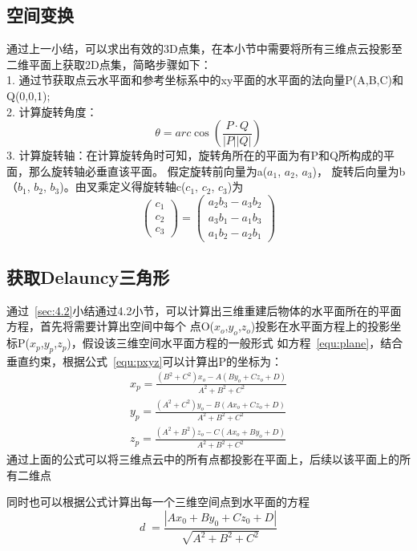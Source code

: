 \subsection{空间变换}
\label{sec:4.4.2}
通过上一小结，可以求出有效的3D点集，在本小节中需要将所有三维点云投影至二维平面上获取2D点集，简略步骤如下：\\
1.	通过节获取点云水平面和参考坐标系中的xy平面的水平面的法向量P(A,B,C)和Q(0,0,1);\\
2.	计算旋转角度：
\begin{equation}
\theta=arc\cos(\frac{P\cdot Q}{\left|P\right|\left|Q\right|})
\end{equation}
3.	计算旋转轴：在计算旋转角时可知，旋转角所在的平面为有P和Q所构成的平面，那么旋转轴必垂直该平面。
假定旋转前向量为a($a_1$, $a_2$, $a_3$)， 旋转后向量为b（$b_1$, $b_2$, $b_3$)。由叉乘定义得旋转轴c($c_1$, $c_2$, $c_3$)为
\begin{equation}
\begin{pmatrix}c_1\\c_2\\c_3\end{pmatrix}=\begin{pmatrix}a_2b_3-a_3b_2\\a_3b_1-a_1b_3\\a_1b_2-a_2b_1\end{pmatrix}
\end{equation}


\subsection{获取Delauncy三角形}
\label{sec:4.4.3}
通过~\ref{sec:4.2}小结通过4.2小节，可以计算出三维重建后物体的水平面所在的平面方程，首先将需要计算出空间中每个
点O($x_o$,$y_o$,$z_o$)投影在水平面方程上的投影坐标P($x_p$,$y_p$,$z_p$)，假设该三维空间水平面方程的一般形式
如方程~\ref{equ:plane}，结合垂直约束，根据公式~\ref{equ:pxyz}可以计算出P的坐标为：
\begin{equation}
\begin{split}
x_p=\frac{(B^2+C^2)x_o-A(By_o+Cz_o+D)}{A^2+B^2+C^2}\\
y_p=\frac{(A^2+C^2)y_o-B(Ax_o+Cz_o+D)}{A^2+B^2+C^2}\\
z_p=\frac{(A^2+B^2)z_o-C(Ax_o+By_o+D)}{A^2+B^2+C^2}
\label{equ:pxyz}
\end{split}
\end{equation}
通过上面的公式可以将三维点云中的所有点都投影在平面上，后续以该平面上的所有二维点

同时也可以根据公式计算出每一个三维空间点到水平面的方程
\begin{equation}
d\;=\frac{\left|Ax_0+By_0+Cz_0+D\right|}{\sqrt{A^2+B^2+C^2}}
\end{equation}






